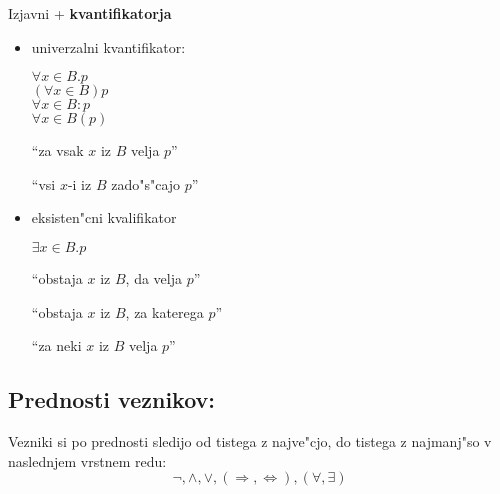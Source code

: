 Izjavni + \textbf{kvantifikatorja}
\begin{itemize}
	\item univerzalni kvantifikator:
	\begin{multicols}{2}
		\(\forall x \in B . p\)\\
		\((\forall x \in B)p\)\\
		\(\forall x \in B: p\)\\
		\(\forall x \in B (p)\)
		
		\columnbreak
		``za vsak \(x\) iz \(B\) velja \(p\)''
		
		``vsi \(x\)-i iz \(B\) zado"s"cajo \(p\)''
	\end{multicols}

	\item eksisten"cni kvalifikator
	\begin{multicols}{2}
		\(\exists x \in B . p\)
		
		\columnbreak
		``obstaja \(x\) iz \(B\), da velja \(p\)''
		
		``obstaja \(x\) iz \(B\), za katerega \(p\)''
		
		``za neki \(x\) iz \(B\) velja \(p\)''
	\end{multicols}
\end{itemize}

\subsection{Prednosti veznikov:}
Vezniki si po prednosti sledijo od tistega z najve"cjo, do tistega z najmanj"so v naslednjem vrstnem redu:
\[\neg, \land, \lor, (\Rightarrow, \Leftrightarrow), (\forall, \exists) \]
